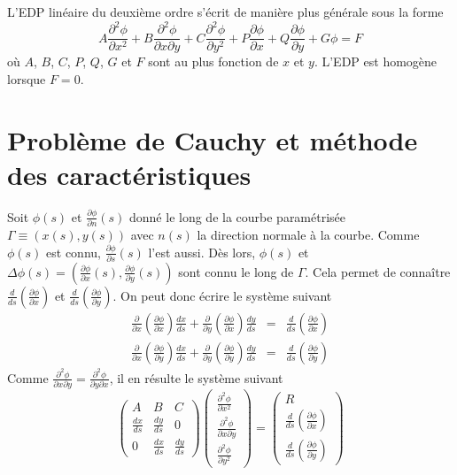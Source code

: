L'EDP linéaire du deuxième ordre s'écrit de manière plus générale sous la forme
\begin{equation}
A \frac{\partial ^2 \phi}{\partial x^2} + B \frac{\partial ^2 \phi}{\partial x \partial y} + C \frac{\partial ^2 \phi}{\partial y^2} + P \frac{\partial \phi}{\partial x} + Q \frac{\partial \phi}{\partial y} + G \phi = F
\end{equation}
où $A$, $B$, $C$, $P$, $Q$, $G$ et $F$ sont au plus fonction de $x$ et $y$. L'EDP est homogène lorsque $F=0$.
\section{Problème de Cauchy et méthode des caractéristiques}
Soit $\phi(s)$ et $\frac{\partial \phi}{\partial n} (s)$ donné le long de la courbe paramétrisée $\Gamma \equiv (x(s),y(s))$ avec $n(s)$ la direction normale à la courbe. Comme $\phi(s)$ est connu, $\frac{\partial  \phi}{\partial s}(s)$ l'est aussi. Dès lors, $\phi(s)$ et $\Delta\phi(s) = \left(\frac{\partial \phi}{\partial x} (s), \frac{\partial \phi}{\partial y}(s)\right)$ sont connu le long de $\Gamma$. Cela permet de connaître $\frac{d}{ds}\left(\frac{\partial \phi}{\partial x}\right)$ et $\frac{d}{ds}\left(\frac{\partial \phi}{\partial y}\right)$. On peut donc écrire le système suivant
\begin{eqnarray}
\frac{\partial}{\partial x}\left(\frac{\partial \phi}{\partial x}\right)\frac{dx}{ds} +\frac{\partial}{\partial y}\left(\frac{\partial \phi}{\partial x}\right)\frac{dy}{ds} & = & \frac{d}{ds}\left(\frac{\partial \phi}{\partial x}\right)\\
\frac{\partial}{\partial x}\left(\frac{\partial \phi}{\partial y}\right)\frac{dx}{ds} +\frac{\partial}{\partial y}\left(\frac{\partial \phi}{\partial y}\right)\frac{dy}{ds} & = & \frac{d}{ds}\left(\frac{\partial \phi}{\partial y}\right)
\end{eqnarray}
Comme $\frac{\partial ^2 \phi}{\partial x \partial y}=\frac{\partial ^2 \phi}{\partial y \partial x}$, il en résulte le système suivant
\begin{equation}
\begin{pmatrix}
A & B & C\\
\frac{dx}{ds} & \frac{dy}{ds} & 0 \\
0 & \frac{dx}{ds} & \frac{dy}{ds}
\end{pmatrix}
\begin{pmatrix}
\frac{\partial ^2 \phi}{\partial x^2}\\
\frac{\partial ^2 \phi}{\partial x \partial y}\\
\frac{\partial ^2 \phi}{\partial y^2}
\end{pmatrix}
=
\begin{pmatrix}
R \\
\frac{d}{ds}\left(\frac{\partial \phi}{\partial x}\right) \\
\frac{d}{ds}\left(\frac{\partial \phi}{\partial y}\right)
\end{pmatrix}
\end{equation}
